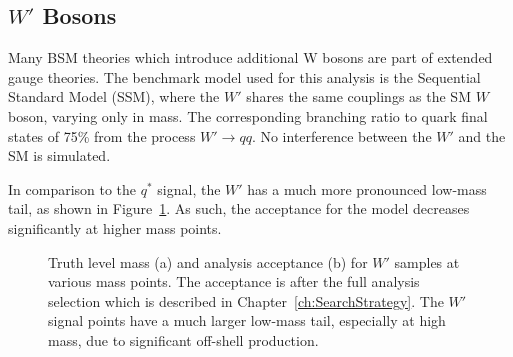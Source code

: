 \subsection{$W'$ Bosons}

Many BSM theories which introduce additional W bosons are part of extended gauge theories.  The benchmark model used for this analysis is the Sequential Standard Model (SSM), where the $W'$ shares the same couplings as the SM $W$ boson, varying only in mass. The corresponding branching ratio to quark final states of 75\% from the process $W'\rightarrow qq$.  No interference between the $W'$ and the SM is simulated.

In comparison to the $q^*$ signal, the $W'$ has a much more pronounced low-mass tail, as shown in Figure~\ref{fig:WPrimePeaks}.  As such, the acceptance for the model decreases significantly at higher mass points.

\begin{figure}[]
	\centering
	\hspace{0.05\columnwidth}%
	\caption{Truth level mass (a) and analysis acceptance (b) for $W'$ samples at various mass points.  The acceptance is after the full analysis selection which is described in Chapter~\ref{ch:SearchStrategy}.  The $W'$ signal points have a much larger low-mass tail, especially at high mass, due to significant off-shell production.
	}
	\label{fig:WPrimePeaks}
\end{figure}

